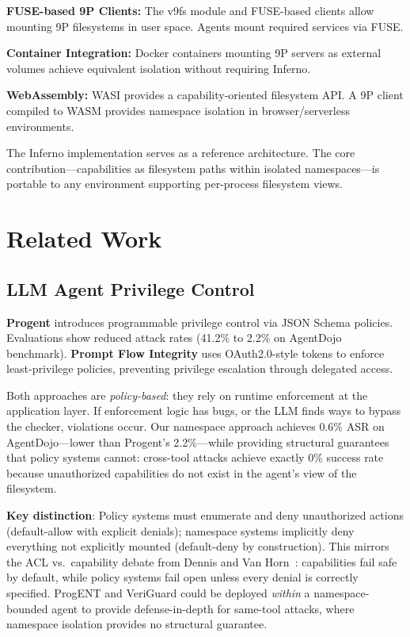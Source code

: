 \documentclass{article}
\begin{document}
\textbf{FUSE-based 9P Clients:} The v9fs module and FUSE-based clients allow mounting 9P filesystems in user space. Agents mount required services via FUSE.

\textbf{Container Integration:} Docker containers mounting 9P servers as external volumes achieve equivalent isolation without requiring Inferno.

\textbf{WebAssembly:} WASI provides a capability-oriented filesystem API. A 9P client compiled to WASM provides namespace isolation in browser/serverless environments.

The Inferno implementation serves as a reference architecture. The core contribution---capabilities as filesystem paths within isolated namespaces---is portable to any environment supporting per-process filesystem views.

\section{Related Work}
\label{sec:related}

\subsection{LLM Agent Privilege Control}

\textbf{Progent} \cite{shi2025progent} introduces programmable privilege control via JSON Schema policies. Evaluations show reduced attack rates (41.2\% to 2.2\% on AgentDojo benchmark). \textbf{Prompt Flow Integrity} \cite{pfi2025} uses OAuth2.0-style tokens to enforce least-privilege policies, preventing privilege escalation through delegated access.

Both approaches are \textit{policy-based}: they rely on runtime enforcement at the application layer. If enforcement logic has bugs, or the LLM finds ways to bypass the checker, violations occur. Our namespace approach achieves 0.6\% ASR on AgentDojo---lower than Progent's 2.2\%---while providing structural guarantees that policy systems cannot: cross-tool attacks achieve exactly 0\% success rate because unauthorized capabilities do not exist in the agent's view of the filesystem.

\textbf{Key distinction}: Policy systems must enumerate and deny unauthorized actions (default-allow with explicit denials); namespace systems implicitly deny everything not explicitly mounted (default-deny by construction). This mirrors the ACL vs.\ capability debate from Dennis and Van Horn~\cite{dennis1966capabilities}: capabilities fail safe by default, while policy systems fail open unless every denial is correctly specified. ProgENT and VeriGuard could be deployed \textit{within} a namespace-bounded agent to provide defense-in-depth for same-tool attacks, where namespace isolation provides no structural guarantee.
\end{document}
